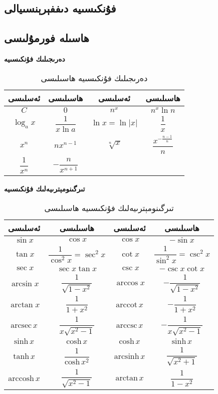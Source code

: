 \subsection{فۇنكىسىيە دىففېرېنسىيالى}
\subsection{ھاسىلە فورمۇلىسى}

\textbf{دەرىجىلىك فۇنكىسىيە}

\begin{table}[H]
	\centering
	\begin{tabular}{cccc}
		\toprule
		ئەسلىسى & ھاسىلىسى & ئەسلىسى & ھاسىلىسى \\ 
		\midrule
		$C$ & $0$ & $n^x$ & $n^x\ln n$ \\\hline
	$\log_ax$ & $\dfrac{1}{x\ln a}$ & $\ln x=\ln\vert x\vert$ & $\dfrac{1}{x}$ \\\hline
		$x^n$ & $nx^{n-1}$ & $\sqrt[n]{x}$ & $\dfrac{x^{-\frac{n-1}{n}}}{n}$ \\\hline
		$\dfrac{1}{x^n}$ & $-\dfrac{n}{x^{n+1}}$ & & \\
		\bottomrule
\end{tabular}
\caption{دەرىجىلىك فۇنكىسىيە ھاسىلىسى}
\end{table}


\textbf{تىرگىنومېترىيەلىك فۇنكىسىيە}
\begin{table}[H]
	\centering
	\begin{tabular}{cccc}
		\toprule
		ئەسلىسى & ھاسىلىسى & ئەسلىسى & ھاسىلىسى \\ 
		\midrule
        $\sin x$ & $\cos x$ & $\cos x$ & $-\sin x$ \\ \hline
$\tan x$ & $\dfrac{1}{\cos^2x}=\sec^2x$ & $\cot x$ & $\dfrac{1}{\sin^2x}=\csc^2x$ \\ \hline
$\sec x$ & $\sec x\tan x$ & $\csc x$ & $-\csc x\cot x$ \\ \hline
$\arcsin x$ & $\dfrac{1}{\sqrt{1-x^2}}$ & $\arccos x$ & $-\dfrac{1}{\sqrt{1-x^2}}$ \\ \hline
$\arctan x$ & $\dfrac{1}{1+x^2}$ & $\textrm{arccot}\,x$ & $-\dfrac{1}{1+x^2}$ \\ \hline
$\textrm{arcsec}\,x$ & $\dfrac{1}{x\sqrt{x^2-1}}$ & $\textrm{arccsc}\,x$ & $-\dfrac{1}{x\sqrt{x^2-1}}$ \\\hline
$\textrm{sinh}\,x$ & $\textrm{cosh}\,x$ & $\textrm{cosh}\,x$ & $\textrm{sinh}\,x$ \\ \hline
$\textrm{tanh}\,x$ & $\dfrac{1}{\textrm{cosh}\,x^2}$ & $\textrm{arcsinh}\,x$ & $\dfrac{1}{\sqrt{x^2+1}}$ \\ \hline
$\textrm{arccosh}\,x$ & $\dfrac{1}{\sqrt{x^2-1}}$ & $\textrm{arctan}\,x$ & $\dfrac{1}{1-x^2}$ \\
		\bottomrule
	\end{tabular}
	\caption{تىرگىنومېترىيەلىك فۇنكىسىيە ھاسىلىسى}
\end{table}


